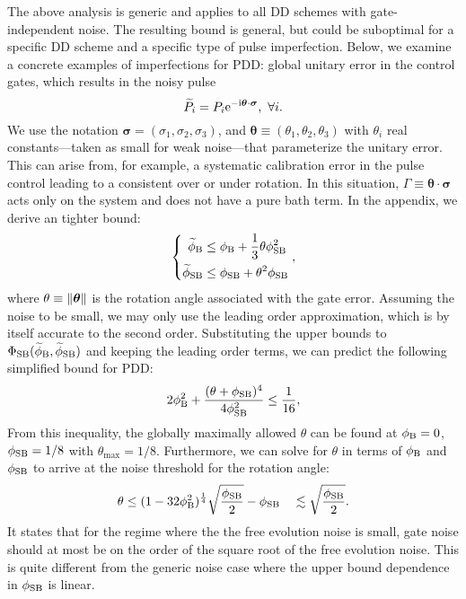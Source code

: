 \documentclass[b5paper,11pt]{article}
\newcommand{\wt}[1]{\widetilde{#1}}
\begin{document}
The above analysis is generic and applies to all DD schemes with gate-independent noise. 
The resulting bound is general, but could be suboptimal for a specific DD scheme and a specific type of pulse imperfection. Below, we examine a concrete examples of imperfections  for PDD: 
global unitary error in the control gates,  which results in the noisy pulse 
\begin{equation}
\widetilde P_i=P_i\mathrm{e}^{-\mathrm{i} \bm{\theta}\cdot\bm\sigma},\ \forall i.
\end{equation}
We use the notation $\bm\sigma=(\sigma_1,\sigma_2,\sigma_3)$, and $\bm\theta\equiv (\theta_1,\theta_2,\theta_3)$ with $\theta_i$ real constants---taken as small for weak noise---that parameterize the unitary error.  This can arise from, for example, a systematic calibration error in the pulse control leading to a consistent over or under rotation. In this situation, $\Gamma\equiv \bm\theta\cdot\bm\sigma$ acts only on the system and does not have a pure bath term. In the appendix, we derive an tighter bound:
\begin{equation}\label{eq:eff-Hami-tcp}
\left\{
\begin{aligned}
\widetilde{\phi}_{\mathrm{B}} &\le \phi_{\mathrm{B}} + \frac{1}{3}\theta  \phi^2_{\mathrm{SB}}  \\
\widetilde{\phi}_{\mathrm{SB}} &\le \phi_{\mathrm{SB}} +  \theta^2  \phi_{\mathrm{SB}}  \\
\end{aligned}    \right.,
\end{equation}
where $\theta \equiv \Vert {\bm \theta} \Vert$ is the rotation angle associated with the gate error.
Assuming the noise to be small, we may only use the leading order 
approximation, which is by itself accurate to the second order. 
Substituting the upper bounds to  $\Phi_\rSB(\wt\phi_\rB,\wt\phi_\rSB)$ and keeping the leading order terms,  we can predict the following simplified bound for PDD:
\begin{equation}\label{eq:npdd-bound-simple}
2\phi_{\mathrm{B}}^2 + \frac{(\theta+\phi_{\mathrm{SB}})^4}{4\phi_{\mathrm{SB}}^2}\le \frac{1}{16},
\end{equation}
From this inequality, the globally maximally allowed $\theta$ can be found at $\phi_{\mathrm{B}}=0$, $\phi_{\mathrm{SB}}=1/8$ with
$\theta_\mathrm{max}= 1/8$. Furthermore, we can solve for $\theta$ in terms of $\phi_{\mathrm{B}}$ and $\phi_{\mathrm{SB}}$ to arrive at the noise threshold for the rotation angle:
\begin{equation}\label{eq:npdd-err-thres}
    \theta \le (1-32\phi_{\mathrm{B}} ^2)^{\frac{1}{4}} \sqrt{\frac{\phi_{\mathrm{SB}}}{2} }-\phi_{\mathrm{SB}}
    \quad \lesssim \sqrt{\frac{\phi_{\mathrm{SB}}}{2}}.
\end{equation}
It states that for the regime where the the free evolution noise is small, gate noise should at most be on the order of the square root of the free evolution noise. This  is quite different from the generic noise case where the upper bound dependence in $\phi_{\mathrm{SB}}$ is linear. 
\end{document}
